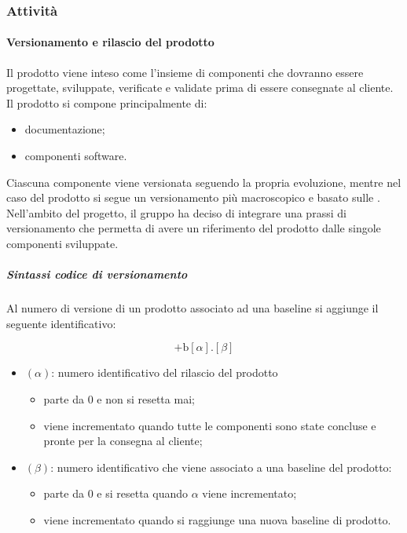 \subsubsection{Attività}

	\paragraph{Versionamento e rilascio del prodotto}

	Il prodotto viene inteso come l'insieme di componenti che dovranno essere progettate, sviluppate, verificate e validate prima di essere consegnate al cliente. Il prodotto si compone principalmente di:
	\begin{itemize}
		\item documentazione;
		\item componenti software.
	\end{itemize}

	Ciascuna componente viene versionata seguendo la propria evoluzione, mentre nel caso del prodotto si segue un versionamento più macroscopico e basato sulle .
	Nell'ambito del progetto, il gruppo ha deciso di integrare una prassi di versionamento che permetta di avere un riferimento del prodotto dalle singole componenti sviluppate.

		\subparagraph{Sintassi codice di versionamento}

		Al numero di versione di un prodotto associato ad una baseline si aggiunge il seguente identificativo:

		\[%
			\text{+b}[\alpha].[\beta]
		\]

		\begin{itemize}
			\item \((\alpha)\): numero identificativo del rilascio del prodotto
			\begin{itemize}
				\item parte da 0 e non si resetta mai;
				\item viene incrementato quando tutte le componenti sono state concluse e pronte per la consegna al cliente;
			\end{itemize}
			\item \((\beta)\): numero identificativo che viene associato a una baseline del prodotto:
			\begin{itemize}
	  			\item parte da 0 e si resetta quando \(\alpha\) viene incrementato;
				\item viene incrementato quando si raggiunge una nuova baseline di prodotto. 
			\end{itemize}
		\end{itemize}


